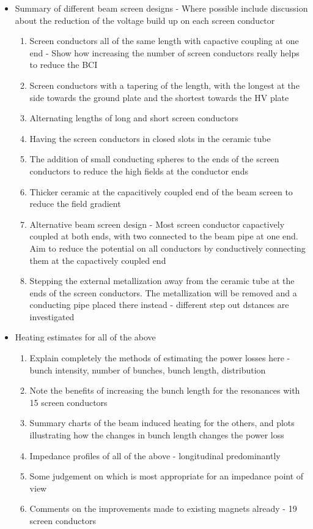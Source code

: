 

\begin{itemize}

\item{Summary of different beam screen designs - Where possible include discussion about the reduction of the voltage build up on each screen conductor}
\begin{enumerate}
\item{Screen conductors all of the same length with capactive coupling at one end - Show how increasing the number of screen conductors really helps to reduce the BCI}
\item{Screen conductors with a tapering of the length, with the longest at the side towards the ground plate and the shortest towards the HV plate}
\item{Alternating lengths of long and short screen conductors}
\item{Having the screen conductors in closed slots in the ceramic tube}
\item{The addition of small conducting spheres to the ends of the screen conductors to reduce the high fields at the conductor ends}
\item{Thicker ceramic at the capacitively coupled end of the beam screen to reduce the field gradient}
\item{Alternative beam screen design - Most screen conductor capactively coupled at both ends, with two connected to the beam pipe at one end. Aim to reduce the potential on all conductors by conductively connecting them at the capactively coupled end}
\item{Stepping the external metallization away from the ceramic tube at the ends of the screen conductors. The metallization will be removed and a conducting pipe placed there instead - different step out dstances are investigated}
\end{enumerate}

\item{Heating estimates for all of the above}
\begin{enumerate}
\item{Explain completely the methods of estimating the power losses here - bunch intensity, number of bunches, bunch length, distribution}
\item{Note the benefits of increasing the bunch length for the resonances with 15 screen conductors}
\item{Summary charts of the beam induced heating for the others, and plots illustrating how the changes in bunch length changes the power loss}
\item{Impedance profiles of all of the above - longitudinal predominantly}
\item{Some judgement on which is most appropriate for an impedance point of view}
\item{Comments on the improvements made to existing magnets already - 19 screen conductors}
\end{enumerate}
\end{itemize}

